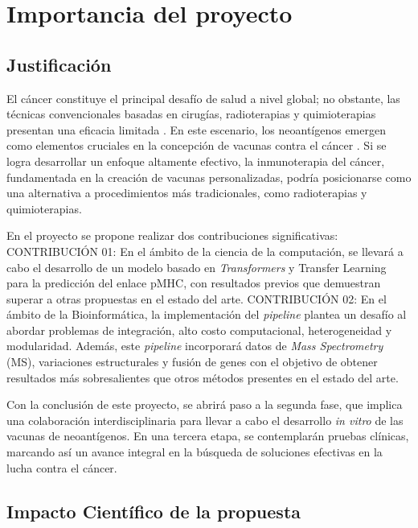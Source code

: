 \documentclass[a4paper,11pt]{article}
\begin{document}
\section{Importancia del proyecto}

\subsection{Justificación}
El cáncer constituye el principal desafío de salud a nivel global; no obstante, las técnicas convencionales basadas en cirugías, radioterapias y quimioterapias presentan una eficacia limitada \cite{peng2019neoantigen}. En este escenario, los neoantígenos emergen como elementos cruciales en la concepción de vacunas contra el cáncer \cite{borden2022cancer,chen2021challenges,gopanenko2020main}. Si se logra desarrollar un enfoque altamente efectivo, la inmunoterapia del cáncer, fundamentada en la creación de vacunas personalizadas, podría posicionarse como una alternativa a procedimientos más tradicionales, como radioterapias y quimioterapias.

En el proyecto se propone realizar dos contribuciones significativas: CONTRIBUCIÓN 01: En el ámbito de la ciencia de la computación, se llevará a cabo el desarrollo de un modelo basado en \textit{Transformers} y Transfer Learning para la predicción del enlace pMHC, con resultados previos que demuestran superar a otras propuestas en el estado del arte. CONTRIBUCIÓN 02: En el ámbito de la Bioinformática, la implementación del \textit{pipeline} plantea un desafío al abordar problemas de integración, alto costo computacional, heterogeneidad y modularidad. Además, este \textit{pipeline} incorporará datos de \textit{Mass Spectrometry} (MS), variaciones estructurales y fusión de genes con el objetivo de obtener resultados más sobresalientes que otros métodos presentes en el estado del arte.

Con la conclusión de este proyecto, se abrirá paso a la segunda fase, que implica una colaboración interdisciplinaria para llevar a cabo el desarrollo \textit{in vitro} de las vacunas de neoantígenos. En una tercera etapa, se contemplarán pruebas clínicas, marcando así un avance integral en la búsqueda de soluciones efectivas en la lucha contra el cáncer.

\subsection{Impacto Científico de la propuesta}
\end{document}
